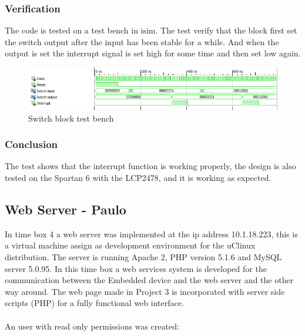 \subsubsection{Verification}
%
The code is tested on a test bench in isim. The test verify that the block first set the switch output after the input has been stable for a while. And when the output is set the interrupt signal is set high for some time and then set low again. 
\begin{figure}[H]
	\begin{centering}
		\includegraphics[width=1.0\textwidth]{images/tb6_switch_tb.png}
		\caption{Switch block test bench}
	\end{centering}
\end{figure}
\subsubsection{Conclusion}
The test shows that the interrupt function is working properly, the design is also tested on the Spartan 6 with the LCP2478, and it is working as expected.
\subsection{Web Server - Paulo}
%
In time box 4 a web server was implemented at the ip address 10.1.18.223, this is a virtual machine assign as development environment for the uClinux distribution. The server is running Apache 2, PHP version 5.1.6 and MySQL server 5.0.95.
In this time box a web services system is developed for the communication between the Embedded device and the web server and the other way around. The web page made in Project 3 is incorporated with server side scripts (PHP) for a fully functional web interface.\\
\\An user with read only permissions was created:

